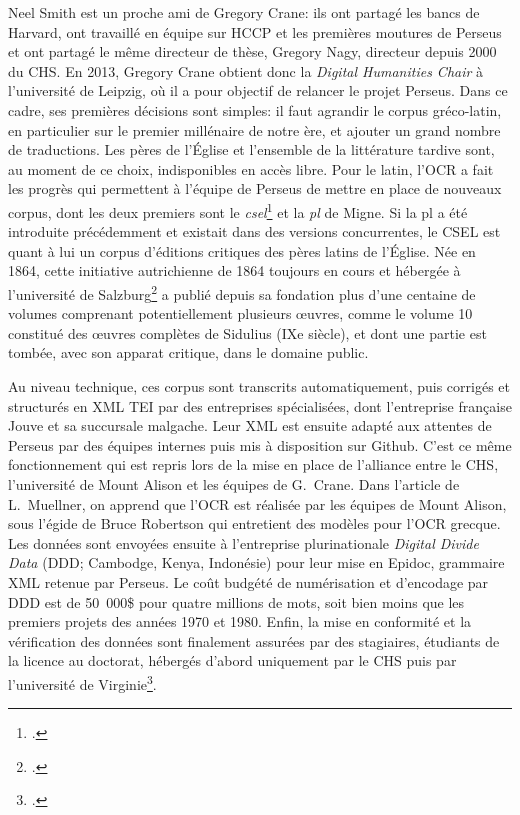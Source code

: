 Neel Smith est un proche ami de Gregory Crane: ils ont partagé les bancs de Harvard, ont travaillé en équipe sur HCCP et les premières moutures de Perseus et ont partagé le même directeur de thèse, Gregory Nagy, directeur depuis 2000 du CHS. En 2013, Gregory Crane obtient donc la \textit{Digital Humanities Chair} à l'université de Leipzig, où il a pour objectif de relancer le projet Perseus. Dans ce cadre, ses premières décisions sont simples: il faut agrandir le corpus gréco-latin, en particulier sur le premier millénaire de notre ère, et ajouter un grand nombre de traductions. Les pères de l'Église et l'ensemble de la littérature tardive sont, au moment de ce choix, indisponibles en accès libre. Pour le latin, l'OCR a fait les progrès qui permettent à l'équipe de Perseus de mettre en place de nouveaux corpus, dont les deux premiers sont le \textit{\acrfull{csel}}\footcite{noauthor_csel_nodate} et la \textit{\acrfull{pl}} de Migne. Si la \acrshort{pl} a été introduite précédemment et existait dans des versions concurrentes, le CSEL est quant à lui un corpus d'éditions critiques des pères latins de l'Église. Née en 1864, cette initiative autrichienne de 1864 toujours en cours et hébergée à l'université de Salzburg\footcite{noauthor_history_nodate} a publié depuis sa fondation plus d'une centaine de volumes comprenant potentiellement plusieurs œuvres, comme le volume 10 constitué des œuvres complètes de Sidulius (IXe siècle), et dont une partie est tombée, avec son apparat critique, dans le domaine public.

Au niveau technique, ces corpus sont transcrits automatiquement, puis corrigés et structurés en XML TEI par des entreprises spécialisées, dont l'entreprise française Jouve et sa succursale malgache. Leur XML est ensuite adapté aux attentes de Perseus par des équipes internes puis mis à disposition sur Github. C'est ce même fonctionnement qui est repris lors de la mise en place de l'alliance entre le CHS, l'université de Mount Alison et les équipes de G.~Crane. Dans l'article de L.~Muellner, on apprend que l'OCR est réalisée par les équipes de Mount Alison, sous l'égide de Bruce Robertson qui entretient des modèles pour l'OCR grecque. Les données sont envoyées ensuite à l'entreprise plurinationale \textit{Digital Divide Data} (DDD; Cambodge, Kenya, Indonésie) pour leur mise en Epidoc, grammaire XML retenue par Perseus. Le coût budgété de numérisation et d'encodage par DDD est de 50~000\$ pour quatre millions de mots, soit bien moins que les premiers projets des années 1970 et 1980. Enfin, la mise en conformité et la vérification des données sont finalement assurées par des stagiaires, étudiants de la licence au doctorat, hébergés d'abord uniquement par le CHS puis par l'université de Virginie\footcite{robertson2019optical}.

